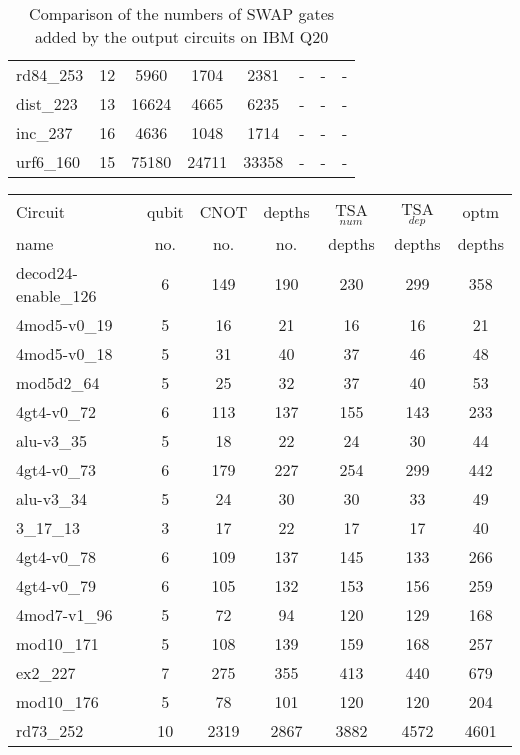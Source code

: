 \documentclass[journal]{IEEEtran}
\begin{document}
\begin{table*}[htbp]
\begin{center}
\begin{tabular}{|p{4.3cm}<{\centering}|c|c|c|c|c|c|c|}
				rd84\_253 & 12 & 5960 & 1704 & 2381 & - & - & - \\ 
				dist\_223 & 13 & 16624 & 4665 & 6235 & - & - & - \\ 
				inc\_237 & 16 & 4636 & 1048 & 1714 & - & - & - \\ 
				urf6\_160 & 15 & 75180 & 24711 & 33358 & - & - & - \\ 
				\hline
			\end{tabular} 
		\end{center}	
		\caption{Comparison of  the numbers of SWAP gates added by the 
			output circuits on IBM Q20 }
		\label{tab5}  
	\end{table*}
	
	\begin{table*}[htbp]
		\begin{center}  
			\begin{tabular}{|p{4.3cm}<{\centering}|c|c|c|c|c|c|}
				\hline
				Circuit &  qubit  & CNOT &depths &TSA$_{num}$& TSA$_{dep}$  & optm 	  	\\
				name	&   no. 	&	no. & no. & depths&  depths &  depths 	\\
				\hline
				decod24-enable\_126 & 6 & 149 & 190 & 230 & 299 & 358 \\ 
				4mod5-v0\_19 & 5 & 16 & 21 & 16 & 16 & 21 \\ 
				4mod5-v0\_18 & 5 & 31 & 40 & 37 & 46 & 48 \\ 
				mod5d2\_64 & 5 & 25 & 32 & 37 & 40 & 53 \\ 
				4gt4-v0\_72 & 6 & 113 & 137 & 155 & 143 & 233 \\ 
				alu-v3\_35 & 5 & 18 & 22 & 24 & 30 & 44 \\ 
				4gt4-v0\_73 & 6 & 179 & 227 & 254 & 299 & 442 \\ 
				alu-v3\_34 & 5 & 24 & 30 & 30 & 33 & 49 \\ 
				3\_17\_13 & 3 & 17 & 22 & 17 & 17 & 40 \\ 
				4gt4-v0\_78 & 6 & 109 & 137 & 145 & 133 & 266 \\ 
				4gt4-v0\_79 & 6 & 105 & 132 & 153 & 156 & 259 \\ 
				4mod7-v1\_96 & 5 & 72 & 94 & 120 & 129 & 168 \\ 
				mod10\_171 & 5 & 108 & 139 & 159 & 168 & 257 \\ 
				ex2\_227 & 7 & 275 & 355 & 413 & 440 & 679 \\ 
				mod10\_176 & 5 & 78 & 101 & 120 & 120 & 204 \\ 
				rd73\_252 & 10 & 2319 & 2867 & 3882 & 4572 & 4601 \\ 

\end{tabular}
\end{center}
\end{table*}
\end{document}
